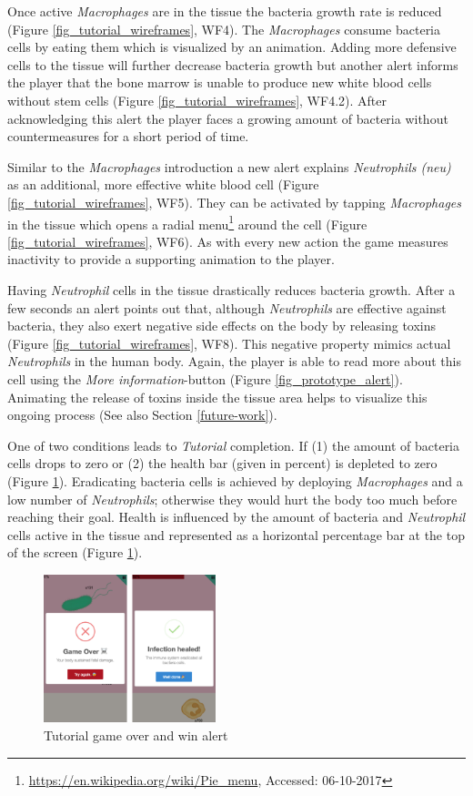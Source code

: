 Once active \textit{Macrophages} are in the tissue the bacteria growth rate is reduced (Figure \ref{fig_tutorial_wireframes}, WF4). The \textit{Macrophages} consume bacteria cells by eating them which is visualized by an animation. Adding more defensive cells to the tissue will further decrease bacteria growth but another alert informs the player that the bone marrow is unable to produce new white blood cells without stem cells (Figure \ref{fig_tutorial_wireframes}, WF4.2). After acknowledging this alert the player faces a growing amount of bacteria without countermeasures for a short period of time.

Similar to the \textit{Macrophages} introduction a new alert explains \textit{Neutrophils (neu)} as an additional, more effective white blood cell (Figure \ref{fig_tutorial_wireframes}, WF5). They can be activated by tapping \textit{Macrophages} in the tissue which opens a radial menu\footnote{\url{https://en.wikipedia.org/wiki/Pie_menu}, Accessed: 06-10-2017} around the cell (Figure \ref{fig_tutorial_wireframes}, WF6). As with every new action the game measures inactivity to provide a supporting animation to the player.

Having \textit{Neutrophil} cells in the tissue drastically reduces bacteria growth. After a few seconds an alert points out that, although \textit{Neutrophils} are effective against bacteria, they also exert negative side effects on the body by releasing toxins (Figure \ref{fig_tutorial_wireframes}, WF8). This negative property mimics actual \textit{Neutrophils} in the human body. Again, the player is able to read more about this cell using the \textit{More information}-button (Figure \ref{fig_prototype_alert}). Animating the release of toxins inside the tissue area helps to visualize this ongoing process (See also Section \ref{future-work}).

One of two conditions leads to \textit{Tutorial} completion. If (1) the amount of bacteria cells drops to zero or (2) the health bar (given in percent) is depleted to zero (Figure \ref{fig_prototype_loosewin}). Eradicating bacteria cells is achieved by deploying \textit{Macrophages} and a low number of \textit{Neutrophils}; otherwise they would hurt the body too much before reaching their goal. Health is influenced by the amount of bacteria and \textit{Neutrophil} cells active in the tissue and represented as a horizontal percentage bar at the top of the screen (Figure \ref{fig_prototype_loosewin}).

\begin{figure}
  \includegraphics[width=5cm]{assets/prototype_loosewin.jpg}
  \caption{Tutorial game over and win alert}
  \centering
  \label{fig_prototype_loosewin}
\end{figure}


